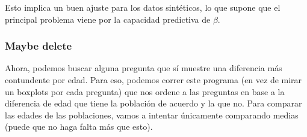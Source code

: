 \documentclass[
]{article}
\newenvironment{Shaded}{\begin{snugshade}}{\end{snugshade}}
\newcommand{\ControlFlowTok}[1]{\textcolor[rgb]{0.13,0.29,0.53}{\textbf{#1}}}
\newcommand{\DecValTok}[1]{\textcolor[rgb]{0.00,0.00,0.81}{#1}}
\newcommand{\FunctionTok}[1]{\textcolor[rgb]{0.13,0.29,0.53}{\textbf{#1}}}
\newcommand{\NormalTok}[1]{#1}
\newcommand{\OtherTok}[1]{\textcolor[rgb]{0.56,0.35,0.01}{#1}}
\newcommand{\SpecialCharTok}[1]{\textcolor[rgb]{0.81,0.36,0.00}{\textbf{#1}}}
\newcommand{\StringTok}[1]{\textcolor[rgb]{0.31,0.60,0.02}{#1}}
\begin{document}
Esto implica un buen ajuste para los datos sintéticos, lo que supone que
el principal problema viene por la capacidad predictiva de \(\beta\).

\subsubsection{Maybe delete}\label{maybe-delete}

Ahora, podemos buscar alguna pregunta que sí muestre una diferencia más
contundente por edad. Para eso, podemos correr este programa (en vez de
mirar un boxplots por cada pregunta) que nos ordene a las preguntas en
base a la diferencia de edad que tiene la población de acuerdo y la que
no. Para comparar las edades de las poblaciones, vamos a intentar
únicamente comparando medias (puede que no haga falta más que esto).

\begin{Shaded}
\end{Shaded}
\end{document}
